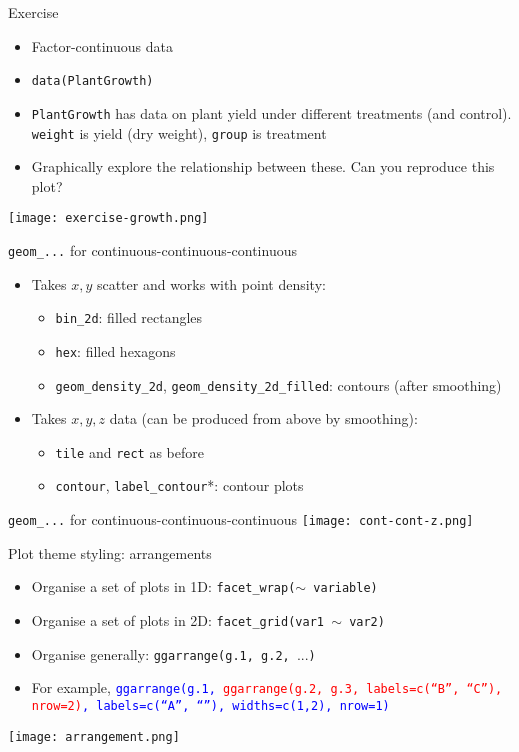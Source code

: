 \documentclass[10pt]{beamer}
\begin{document}
\begin{frame}{Exercise}
  \begin{itemize}
  \item Factor-continuous data
    \item[] \texttt{data(PlantGrowth)}
    \item \texttt{PlantGrowth} has data on plant yield under different treatments (and control). \texttt{weight} is yield (dry weight), \texttt{group} is treatment
     \item Graphically explore the relationship between these. Can you reproduce this plot?
  \end{itemize}
  \texttt{[image: exercise-growth.png]}
\end{frame}

\begin{frame}{\texttt{geom\_...} for continuous-continuous-continuous}
  \begin{itemize}
  \item Takes $x,y$ scatter and works with point density:
    \begin{itemize}
                     \item \texttt{bin\_2d}: filled rectangles
                     \item \texttt{hex}: filled hexagons
                       \item \texttt{geom\_density\_2d}, \texttt{geom\_density\_2d\_filled}: contours (after smoothing)
    \end{itemize}
  \item Takes $x,y,z$ data (can be produced from above by smoothing):
    \begin{itemize}
      \item \texttt{tile} and \texttt{rect} as before
                 \item \texttt{contour}, \texttt{label\_contour}*: contour plots
    \end{itemize}
    \end{itemize}
\end{frame}

\begin{frame}{\texttt{geom\_...} for continuous-continuous-continuous}
  \texttt{[image: cont-cont-z.png]}
\end{frame}

\begin{frame}{Plot theme styling: arrangements}
    \begin{itemize}
    \item Organise a set of plots in 1D: \texttt{facet\_wrap($\sim$ variable)}
      \item Organise a set of plots in 2D: \texttt{facet\_grid(var1 $\sim$ var2)}
      \item Organise generally: \texttt{ggarrange(g.1, g.2, }...\texttt{)}
        \item For example, \texttt{\textcolor{blue}{ggarrange(g.1, }\textcolor{red}{ggarrange(g.2, g.3, labels=c(``B'', ``C''), nrow=2)}\textcolor{blue}{, labels=c(``A'', ``''), widths=c(1,2), nrow=1)}}
    \end{itemize}
    \texttt{[image: arrangement.png]}
\end{frame}
\end{document}

